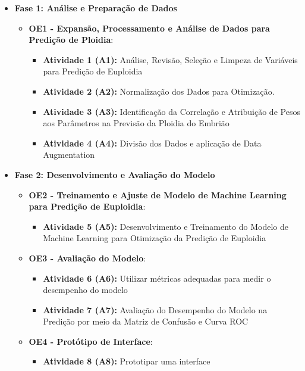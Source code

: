 \begin{itemize}
    \item \textbf{Fase 1: Análise e Preparação de Dados}
    \begin{itemize}
        \item \textbf{OE1 - Expansão, Processamento e Análise de Dados para Predição de Ploidia}: 
        \begin{itemize}
            \item \textbf{Atividade 1 (A1):} Análise, Revisão, Seleção e Limpeza de Variáveis para Predição de Euploidia 
            \item \textbf{Atividade 2 (A2):} Normalização dos Dados para Otimização.
            \item \textbf{Atividade 3 (A3):} Identificação da Correlação e Atribuição de Pesos aos Parâmetros na Previsão da Ploidia do Embrião 
            \item \textbf{Atividade 4 (A4):} Divisão dos Dados e aplicação de Data Augmentation
        \end{itemize}
    \end{itemize}

    \item \textbf{Fase 2: Desenvolvimento e Avaliação do Modelo}
    \begin{itemize}
        \item \textbf{OE2 - Treinamento e Ajuste de Modelo de Machine Learning para Predição de Euploidia}: 
        \begin{itemize}
            \item \textbf{Atividade 5 (A5):} Desenvolvimento e Treinamento do Modelo de Machine Learning para Otimização da Predição de Euploidia
        \end{itemize}

        \item \textbf{OE3 - Avaliação do Modelo}: 
        \begin{itemize}
            \item \textbf{Atividade 6 (A6):} Utilizar métricas adequadas para medir o desempenho do modelo
            \item \textbf{Atividade 7 (A7):} Avaliação do Desempenho do Modelo na Predição por meio da Matriz de Confusão e Curva ROC
        \end{itemize}

        \item \textbf{OE4 - Protótipo de Interface}: 
        \begin{itemize}
            \item \textbf{Atividade 8 (A8):} Prototipar uma interface
        \end{itemize}
    \end{itemize}
\end{itemize}

